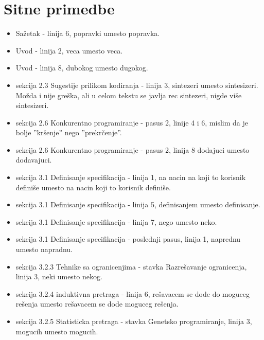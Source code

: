 \documentclass[a4paper]{report}
\begin{document}
\section{Sitne primedbe}
\begin{itemize}
    \item Sažetak - linija 6, popravki umesto popravka.\\
    \item Uvod - linija 2, veca umesto veca.\\
    \item Uvod - linija 8, dubokog umesto dugokog.\\
    \item sekcija 2.3 Sugestije prilikom kodiranja - linija 3, sintezeri umesto sintesizeri. Možda i nije greška, ali u celom tekstu se javlja rec sintezeri, nigde više sintesizeri.\\
    \item sekcija 2.6 Konkurentno programiranje - pasus 2, linije 4 i 6, mislim da je bolje ''kršenje'' nego ''prekrčenje''.\\
    \item sekcija 2.6 Konkurentno programiranje - pasus 2, linija 8 dodajuci umesto dodavajuci.\\
    \item sekcija 3.1 Definisanje specifikacija - linija 1, na nacin na koji to korisnik definiše umesto na nacin koji to korisnik definiše.\\
    \item sekcija 3.1 Definisanje specifikacija - linija 5, definisanjem umesto definisanje.\\
    \item sekcija 3.1 Definisanje specifikacija - linija 7, nego umesto neko.\\
    \item sekcija 3.1 Definisanje specifikacija - poslednji pasus, linija 1, naprednu umesto napradnu.\\
    \item sekcija 3.2.3 Tehnike sa ogranicenjima - stavka Razrešavanje ogranicenja, linija 3, neki umesto nekog.\\
    \item sekcija 3.2.4 induktivna pretraga - linija 6, rešavacem se dode do moguceg rešenja umesto rešavacem se dode moguceg rešenja.\\
    \item sekcija 3.2.5 Statisticka pretraga - stavka Genetsko programiranje, linija 3, mogucih umesto mogucih.\\

\end{itemize}
\end{document}
